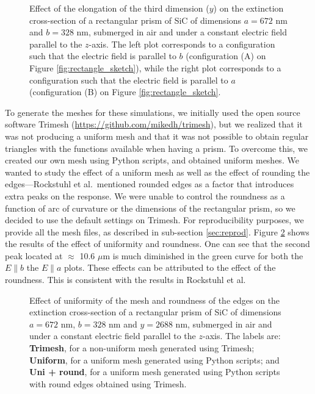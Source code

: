 \begin{figure}
    \centering
    \caption{Effect of the elongation of the third dimension ($y$) on the 
        extinction cross-section of a rectangular prism of SiC of dimensions $a=672$ nm 
        and $b=328$ nm, submerged in air and under a constant electric field 
        parallel to the $z$-axis. The left plot corresponds to a configuration such that the electric 
        field is parallel to $b$ (configuration (A) on Figure \ref{fig:rectangle_sketch}), while the 
        right plot corresponds to a configuration such that the electric field is 
        parallel to $a$ (configuration (B) on Figure \ref{fig:rectangle_sketch}.}
    \label{fig:ext_y_14}   
 \end{figure}


To generate the meshes for these simulations, we initially used the open source software Trimesh 
(\url{https://github.com/mikedh/trimesh}), but we realized that it was not producing a 
uniform mesh and that it was not possible to obtain regular triangles with the functions 
available when having a prism. To overcome this, we created our own mesh using Python scripts,
and obtained uniform meshes. We wanted to study the effect of a uniform mesh as well as the effect
of rounding the edges---Rockstuhl et al.\ mentioned rounded edges
as a factor that introduces extra peaks on the response. We were unable to control the 
roundness as a function of arc of curvature or the dimensions of the rectangular prism, so we 
decided to use the default settings on Trimesh. 
For reproducibility purposes, we provide all the mesh files, as described in sub-section \ref{sec:reprod}.
Figure \ref{fig:tri_reg_round_14} shows the 
results of the effect of uniformity and roundness. One can see that the second peak located at $\approx$ 10.6 $\mu$m  is much diminished in the green curve for both the $E\parallel b$  the $E\parallel a$ plots. 
These effects can be attributed 
to the effect of the roundness. This is consistent with the results in Rockstuhl et al. 

\begin{figure}
    \centering
    \caption{Effect of uniformity of the mesh and roundness of the edges on the 
    extinction cross-section of a rectangular prism of SiC of dimensions $a=672$ nm, 
    $b=328$ nm and $y=2688$ nm, submerged in air and under a constant electric field 
    parallel to the $z$-axis. The labels are: \textbf{Trimesh}, for a non-uniform mesh generated using Trimesh; 
    \textbf{Uniform}, for a uniform mesh generated using Python scripts; and 
    \textbf{Uni + round}, for a uniform mesh generated using Python scripts with round 
    edges obtained using Trimesh.}
    \label{fig:tri_reg_round_14}
 \end{figure}

